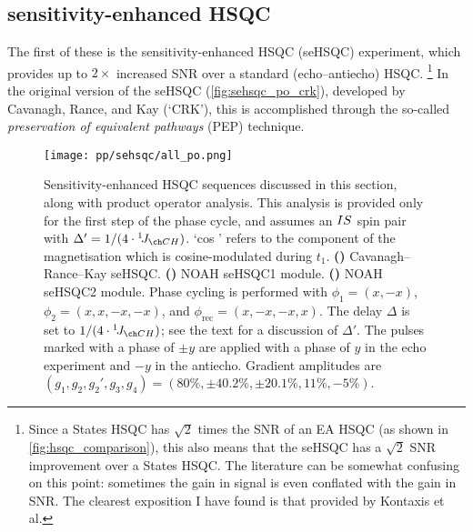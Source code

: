 \subsection{\texorpdfstring{\carbon{}}{13C} sensitivity-enhanced HSQC}
\label{subsec:noah__sehsqc_c}

The first of these is the sensitivity-enhanced HSQC (seHSQC) experiment, which provides up to $2\times$ increased SNR over a standard (echo--antiecho) HSQC.%
\footnote{Since a States HSQC has $\sqrt{2}$ times the SNR of an EA HSQC (as shown in \cref{fig:hsqc_comparison}), this also means that the seHSQC has a $\sqrt{2}$ SNR improvement over a States HSQC. The literature can be somewhat confusing on this point: sometimes the gain in signal is even conflated with the gain in SNR. The clearest exposition I have found is that provided by Kontaxis et al.\autocite{Kontaxis1994JMRSA}}
In the original version of the seHSQC (\cref{fig:sehsqc_po_crk}), developed by Cavanagh, Rance, and Kay (`CRK')\autocite{Palmer1991JMR,Kay1992JACS}, this is accomplished through the so-called \textit{preservation of equivalent pathways} (PEP) technique\autocite{Cavanagh1993ARNMRS}.

\begin{figure}[!htbp]
    \centering
    \texttt{[image: pp/sehsqc/all\_po.png]}%
    {\label{fig:sehsqc_po_crk}}%
    {\label{fig:sehsqc_po_noah1}}%
    {\label{fig:sehsqc_po_noah2}}%
    \caption[CRK seHSQC and NOAH seHSQC modules]{
        Sensitivity-enhanced HSQC sequences discussed in this section, along with product operator analysis.
        This analysis is provided only for the first step of the phase cycle, and assumes an $IS\/$ spin pair with $\Delta' = 1 / (4 \cdot \oneJ{CH})$.
        `cos ' refers to the component of the  magnetisation which is cosine-modulated during $t_1$.
        \textbf{()} Cavanagh--Rance--Kay seHSQC.
        \textbf{()} NOAH seHSQC1 module.
        \textbf{()} NOAH seHSQC2 module.
        Phase cycling is performed with $\phi_1 = (x, -x)$, $\phi_2 = (x, x, -x, -x)$, and $\phi_\text{rec} = (x, -x, -x, x)$.
        The delay $\Delta$ is set to $1 / (4 \cdot \oneJ{CH})$; see the text for a discussion of $\Delta'$.
        The pulses marked with a phase of $\pm y$ are applied with a phase of $y$ in the echo experiment and $-y$ in the antiecho.
        Gradient amplitudes are $(g_1, g_2, g_2', g_3, g_4) = (80\%, \pm 40.2\%, \pm 20.1\%, 11\%, -5\%)$.
    }
    \label{fig:sehsqc_po}
\end{figure}

